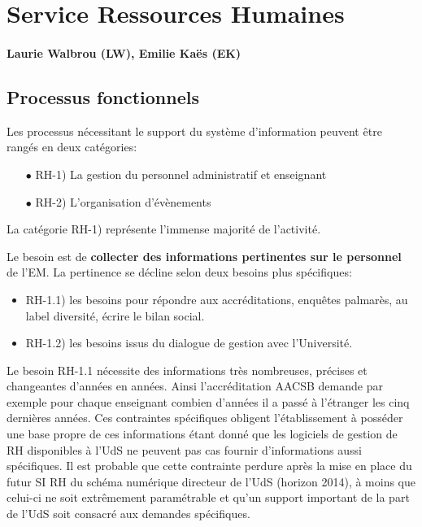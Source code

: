 \documentclass{book}
\begin{document}
	


\section{Service Ressources Humaines}

\paragraph{Laurie Walbrou (LW), Emilie Kaës (EK)}


\subsection{Processus fonctionnels}
\label{sc:rh-process}
Les processus nécessitant le support du système d'information peuvent 
être rangés en deux catégories:
\begin{itemize}
\item[$\bullet$] RH-1) La gestion du personnel administratif et enseignant
\item[$\bullet$] RH-2) L'organisation d'évènements
\end{itemize}
\bigskip

La catégorie RH-1) représente l'immense majorité de l'activité.

Le besoin est de \textbf{collecter des informations pertinentes
sur le personnel} de l'EM. La pertinence se décline selon
deux besoins plus spécifiques:
\begin{itemize}
\item RH-1.1) les besoins pour répondre aux accréditations, enquêtes 
	palmarès, au label diversité, écrire le bilan social.
\item RH-1.2) les besoins issus du dialogue de gestion avec l'Université.
\end{itemize}

\bigskip

Le besoin RH-1.1 nécessite des informations très nombreuses, précises
et changeantes d'années en années. Ainsi l'accréditation AACSB demande
par exemple pour chaque enseignant combien d'années il a passé à l'étranger 
les cinq dernières années. Ces contraintes spécifiques obligent 
l'établissement à posséder une base propre de ces informations étant donné 
que les logiciels de gestion de RH disponibles à l'UdS ne peuvent pas 
cas fournir d'informations aussi spécifiques. Il est probable que cette
contrainte perdure après la mise en place du futur SI RH du schéma numérique
directeur de l'UdS (horizon 2014), à moins que celui-ci ne soit extrêmement 
paramétrable et qu'un support important de la part de l'UdS soit consacré 
aux demandes spécifiques.\\
\end{document}
